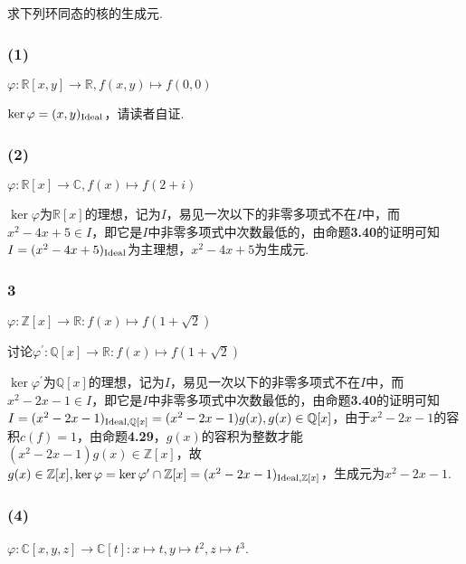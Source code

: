 
\subsection{}
求下列环同态的核的生成元.
\subsubsection{(1)} 
$\varphi:\mathbb{R}[x,y]\rightarrow \mathbb{R}, f(x,y)\mapsto f(0,0)$

\jie $\ker\varphi=(x,y)_{\operatorname{Ideal}}$，请读者自证.

\subsubsection{(2)}
$\varphi:\mathbb{R}[x]\rightarrow \mathbb{C}, f(x)\mapsto f(2+i)$

\jie $\ker\varphi$为$\mathbb{R}[x]$的理想，记为$I$，易见一次以下的非零多项式不在$I$中，而$x^2-4x+5\in I$，即它是$I$中非零多项式中次数最低的，由{\heiti 命题}\textbf{3.40}的证明可知$I=(x^2-4x+5)_{\operatorname{Ideal}}$为主理想，$x^2-4x+5$为生成元.

\subsubsection{{3}}
$\varphi: \mathbb{Z}[x]\rightarrow \mathbb{R}: f(x)\mapsto f(1+\sqrt{2})$

\jie 讨论$\varphi^{\prime}: \mathbb{Q}[x]\rightarrow \mathbb{R}: f(x)\mapsto f(1+\sqrt{2})$

 $\ker\varphi^{\prime}$为$\mathbb{Q}[x]$的理想，记为$I$，易见一次以下的非零多项式不在$I$中，而$x^2-2x-1\in I$，即它是$I$中非零多项式中次数最低的，由{\heiti 命题}\textbf{3.40}的证明可知$I=(x^2-2x-1)_{\operatorname{Ideal},\mathbb{Q}[x]}=(x^2-2x-1)g(x), g(x)\in\mathbb{Q}[x]$，由于$x^2-2x-1$的容积$c(f)=1$，由{\heiti 命题}\textbf{4.29}，$g(x)$的容积为整数才能$(x^2-2x-1)g(x)\in\mathbb{Z}[x]$，故$g(x)\in\mathbb{Z}[x], \ker\varphi=\ker\varphi^{\prime}\cap \mathbb{Z}[x]=(x^2-2x-1)_{\operatorname{Ideal}, \mathbb{Z}[x]}$，生成元为$x^2-2x-1$.
 
 \subsubsection{(4)}
 $\varphi: \mathbb{C}[x,y,z]\rightarrow\mathbb{C}[t]:x\mapsto t, y\mapsto t^2, z\mapsto t^3$.
 

